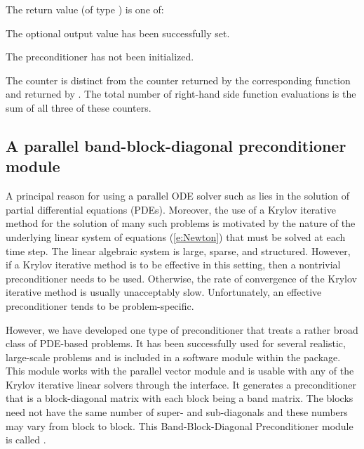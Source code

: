 {
  The return value  (of type ) is one of:
  \begin{args}
  \item[\Id{CVSPILS\_SUCCESS}] 
    The optional output value has been successfully set.
  \item[\Id{CVSPILS\_PMEM\_NULL}]
    The {\cvbandpre} preconditioner has not been initialized.
  \end{args}
}
{
The counter  is distinct from the counter 
returned by the corresponding function  and
 returned by .
The total number of right-hand side function evaluations is the
sum of all three of these counters.
}

\subsection{A parallel band-block-diagonal preconditioner module}
\label{sss:cvbbdpre}

A principal reason for using a parallel ODE solver such as {\cvode} lies
in the solution of partial differential equations (PDEs).  Moreover,
the use of a Krylov iterative method for the solution of many such
problems is motivated by the nature of the underlying linear system of
equations (\ref{e:Newton}) that must be solved at each time step.  The
linear algebraic system is large, sparse, and structured. However, if
a Krylov iterative method is to be effective in this setting, then a
nontrivial preconditioner needs to be used.  Otherwise, the rate of
convergence of the Krylov iterative method is usually unacceptably
slow.  Unfortunately, an effective preconditioner tends to be
problem-specific.

However, we have developed one type of preconditioner that treats a
rather broad class of PDE-based problems.  It has been successfully
used for several realistic, large-scale problems \cite{HiTa:98} and is
included in a software module within the {\cvode} package. This module
works with the parallel vector module {\nvecp} and is usable with any of
the Krylov iterative linear solvers through the {\cvspils} interface.
It generates a preconditioner that is a block-diagonal matrix with
each block being a band matrix. The blocks need not have the same
number of super- and sub-diagonals and these numbers may vary from
block to block. This Band-Block-Diagonal Preconditioner module is
called {\cvbbdpre}. 

